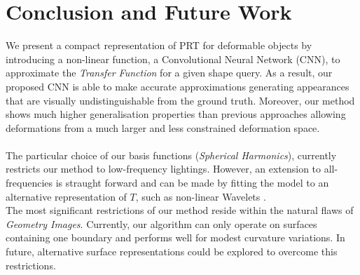 \section{Conclusion and Future Work}
We present a compact representation of PRT for deformable objects by introducing a non-linear function, a Convolutional Neural Network (CNN), to approximate the \textit{Transfer Function} for a given shape query. As a result, our proposed CNN is able to make accurate approximations generating appearances that are visually undistinguishable from the ground truth. Moreover, our method shows much higher generalisation properties than previous approaches allowing deformations from a much larger and less constrained deformation space.\\
\\
The particular choice of our basis functions (\textit{Spherical Harmonics}), currently restricts our method to low-frequency lightings. However, an extension to all-frequencies is straught forward and can be made by fitting the model to an alternative representation of $T$, such as non-linear Wavelets \cite{AllFrequencyPRT}.\\
The most significant restrictions of our method reside within the natural flaws of \textit{Geometry Images}. Currently, our algorithm can only operate on surfaces containing one boundary and performs well for modest curvature variations. In future, alternative surface representations could be explored to overcome this restrictions.
